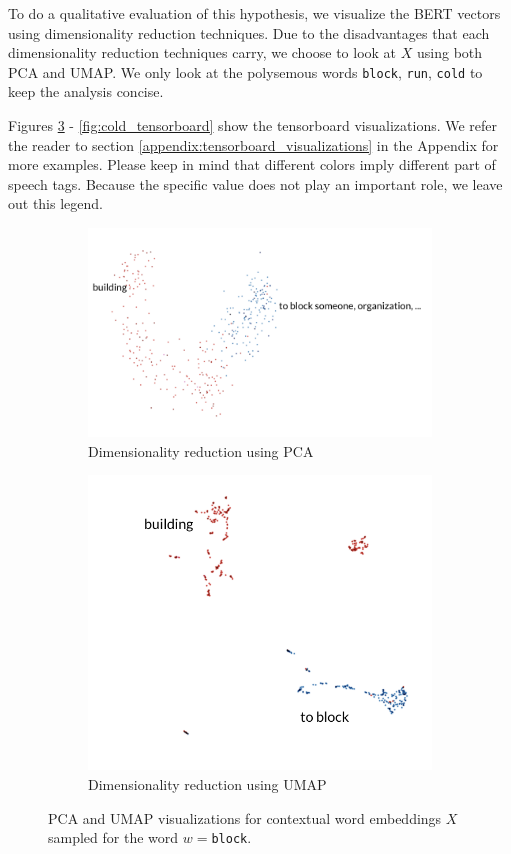 \documentclass[a4paper,12pt,oneside,openright]{report}
\begin{document}
To do a qualitative evaluation of this hypothesis, we visualize the BERT vectors using dimensionality reduction techniques.
Due to the disadvantages that each dimensionality reduction techniques carry, we choose to look at $X$ using both PCA and UMAP.
We only look at the polysemous words \Verb#block#, \Verb#run#, \Verb#cold# to keep the analysis concise.

Figures \ref{fig:was_tensorboard} - \ref{fig:cold_tensorboard} show the tensorboard visualizations.
We refer the reader to section \ref{appendix:tensorboard_visualizations} in the Appendix for more examples.
Please keep in mind that different colors imply different part of speech tags. 
Because the specific value does not play an important role, we leave out this legend.

\begin{figure}
\begin{subfigure}{.45\textwidth}
  \centering
  \includegraphics[width=\linewidth]{./assets/analysis/block_pca.png}
  \caption{Dimensionality reduction using PCA}
  \label{fig:sfig1}
\end{subfigure}%
\hfill
\begin{subfigure}{.45\textwidth}
  \centering
  \includegraphics[width=.7\linewidth]{./assets/analysis/block_umap.png}
  \caption{Dimensionality reduction using UMAP}
  \label{fig:sfig2}
\end{subfigure}
\caption{PCA and UMAP visualizations for contextual word embeddings $X$ sampled for the word $w=$\texttt{block}. }
\label{fig:was_tensorboard}
\end{figure}
\end{document}

